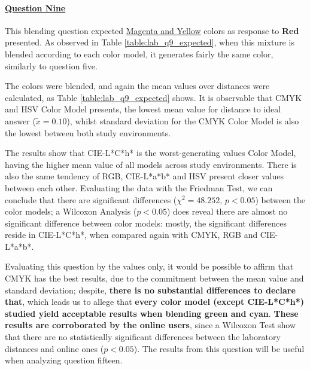 \paragraph{\ul{Question Nine}}
%
This blending question expected \ul{Magenta and Yellow} colors as response to \textbf{Red} presented. As observed in Table \ref{table:lab_q9_expected}, when this mixture is blended according
to each color model, it generates fairly the same color, similarly to question five. \par
%
The colors were blended, and again the mean values over distances were calculated, as Table \ref{table:lab_q9_expected} shows. It is observable that CMYK and HSV Color Model presents,
the lowest mean value for distance to ideal answer ($\tilde{x} = 0.10$), whilst standard deviation for the CMYK Color Model is also the lowest between both study environments. \par
%
The results show that CIE-L*C*h* is the worst-generating values Color Model, having the higher mean value of all models across study environments. There is also the same tendency of RGB,
CIE-L*a*b* and HSV present closer values between each other. Evaluating the data with the Friedman Test, we can conclude that there are significant differences ($\chi^2 = 48.252$, $p < 0.05$)
between the color models; a Wilcoxon Analysis ($p < 0.05$) does reveal there are almost no significant difference between color models: mostly, the significant differences reside in CIE-L*C*h*, when
compared again with CMYK, RGB and CIE-L*a*b*. \par
%
Evaluating this question by the values only, it would be possible to affirm that CMYK has the best results, due to the commitment between the mean value and standard deviation; despite,
\textbf{there is no substantial differences to declare that}, which leads us to allege that \textbf{every color model (except CIE-L*C*h*) studied yield acceptable results when blending green and cyan}.
%
\textbf{These results are corroborated by the online users}, since a Wilcoxon Test show that there are no statistically significant differences between the laboratory distances and online ones ($p < 0.05$).
The results from this question will be useful when analyzing question fifteen.
%
